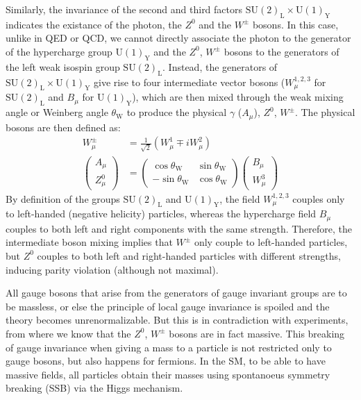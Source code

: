 Similarly, the invariance of the second and third factors $\text{SU}(2)_{\text{L}}\times \text{U}(1)_{\text{Y}}$ indicates the existance of the photon, the $Z^{0}$ and the $W^{\pm}$ bosons. In this case, unlike in QED or QCD, we cannot directly associate the photon to the generator of the hypercharge group $\text{U}(1)_{\text{Y}}$ and the $Z^{0}$, $W^{\pm}$ bosons to the generators of the left weak isospin group $\text{SU}(2)_{\text{L}}$. Instead, the generators of $\text{SU}(2)_{\text{L}}\times \text{U}(1)_{\text{Y}}$ give rise to four intermediate vector bosons ($W_\mu^{1,2,3}$ for $\text{SU}(2)_{\text{L}}$ and $B_\mu$ for $\text{U}(1)_{\text{Y}}$), which are then mixed through the weak mixing angle or Weinberg angle $\theta_{\text{W}}$ to produce the physical $\gamma$ ($A_\mu$), $Z^{0}$, $W^{\pm}$. The physical bosons are then defined as:
\begin{align*}
    W_\mu^{\pm} &= \frac{1}{\sqrt{2}}(W_\mu^{1}\mp iW_\mu^{2})\\
    \begin{pmatrix}
        A_\mu \\
        Z^{0}_\mu
    \end{pmatrix}
    &=
    \begin{pmatrix}
        \cos{\theta_{\text{W}}} & \sin{\theta_{\text{W}}} \\
        -\sin{\theta_{\text{W}}} & \cos{\theta_{\text{W}}}
    \end{pmatrix}
    \begin{pmatrix}
        B_\mu \\
        W^{3}_\mu
    \end{pmatrix}
\end{align*}
By definition of the groups $\text{SU}(2)_{\text{L}}$ and $\text{U}(1)_{\text{Y}}$, the field $W_\mu^{1,2,3}$ couples only to left-handed (negative helicity) particles, whereas the hypercharge field $B_\mu$ couples to both left and right components with the same strength. Therefore, the intermediate boson mixing implies that $W^{\pm}$ only couple to left-handed particles, but $Z^{0}$ couples to both left and right-handed particles with different strengths, inducing parity violation (although not maximal).

All gauge bosons that arise from the generators of gauge invariant groups are to be massless, or else the principle of local gauge invariance is spoiled and the theory becomes unrenormalizable. But this is in contradiction with experiments, from where we know that the $Z^{0}$, $W^{\pm}$ bosons are in fact massive. This breaking of gauge invariance when giving a mass to a particle is not restricted only to gauge bosons, but also happens for fermions. In the SM, to be able to have massive fields, all particles obtain their masses using spontanoeus symmetry breaking (SSB) via the Higgs mechanism.

